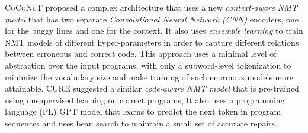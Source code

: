 %
\textsc{CoCoNuT} \citep{Lutellier2020} proposed a complex architecture that uses
a new \emph{context-aware NMT model} that has two separate \emph{Convolutional
Neural Network (CNN)} encoders, one for the buggy lines and one for the context.
It also uses \emph{ensemble learning} to train NMT models of different
hyper-parameters in order to capture different relations between erroneous and
correct code. This approach uses a minimal level of abstraction over the input
programs, with only a subword-level tokenization to minimize the vocabulary size
and make training of such enormous models more attainable. \textsc{CURE}
\citep{Jiang_2021} suggested a similar \emph{code-aware NMT model} that is
pre-trained using unsupervised learning on correct programs, It also uses a
programming language (PL) \textsc{GPT} \citep{GPT2020} model that learns to
predict the next token in program sequences and uses bean search to maintain a
small set of accurate repairs.
